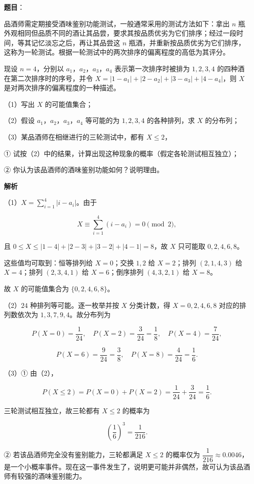 \begin{answer}

\textbf{题目}：

品酒师需定期接受酒味鉴别功能测试，一般通常采用的测试方法如下：拿出 $n$ 瓶外观相同但品质不同的酒让其品尝，要求其按品质优劣为它们排序；经过一段时间，等其记忆淡忘之后，再让其品尝这 $n$ 瓶酒，并重新按品质优劣为它们排序，这称为一轮测试。根据一轮测试中的两次排序的偏离程度的高低为其评分。

现设 $n=4$，分别以 $a_1$，$a_2$，$a_3$，$a_4$ 表示第一次排序时被排为 $1,2,3,4$ 的四种酒在第二次排序时的序号，并令 $X=|1-a_1|+|2-a_2|+|3-a_3|+|4-a_4|$，则 $X$ 是对两次排序的偏离程度的一种描述。

（1）写出 $X$ 的可能值集合；

（2）假设 $a_1$，$a_2$，$a_3$，$a_4$ 等可能的为 $1,2,3,4$ 的各种排列，求 $X$ 的分布列；

（3）某品酒师在相继进行的三轮测试中，都有 $X\leqslant2$，

① 试按（2）中的结果，计算出现这种现象的概率（假定各轮测试相互独立）；

② 你认为该品酒师的酒味鉴别功能如何？说明理由。

\textbf{解析}

（1）$X=\sum\limits_{i=1}^4|i-a_i|$。由于

\nopagebreak[4]
\[X\equiv\sum_{i=1}^4(i-a_i)=0\pmod 2,\]

且 $0\leqslant X\leqslant|1-4|+|2-3|+|3-2|+|4-1|=8$，故 $X$ 只可能取 $0,2,4,6,8$。

这些值均可取到：恒等排列给 $X=0$；交换 $1,2$ 给 $X=2$；排列 $(2,1,4,3)$ 给 $X=4$；排列 $(2,3,4,1)$ 给 $X=6$；倒序排列 $(4,3,2,1)$ 给 $X=8$。

故 $X$ 的可能值集合为 $\{0,2,4,6,8\}$。

（2）$24$ 种排列等可能。逐一枚举并按 $X$ 分类计数，得 $X=0,2,4,6,8$ 对应的排列数依次为 $1,3,7,9,4$。故分布列为

\nopagebreak[4]
\[P(X=0)=\frac1{24},\quad P(X=2)=\frac3{24}=\frac18,\quad P(X=4)=\frac7{24},\]

\nopagebreak[4]
\[P(X=6)=\frac9{24}=\frac38,\quad P(X=8)=\frac4{24}=\frac16.\]

（3）① 由（2），

\nopagebreak[4]
\[P(X\leqslant2)=P(X=0)+P(X=2)=\frac1{24}+\frac3{24}=\frac16.\]

三轮测试相互独立，故三轮都有 $X\leqslant2$ 的概率为

\nopagebreak[4]
\[\left(\frac16\right)^3=\frac1{216}.\]

② 若该品酒师完全没有鉴别能力，三轮都满足 $X\leqslant2$ 的概率仅为 $\dfrac1{216}\approx0.0046$，是一个小概率事件。现在这一事件发生了，说明更可能并非偶然，故可认为该品酒师有较强的酒味鉴别能力。


\end{answer}